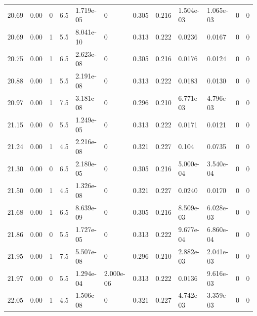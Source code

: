 \documentclass[preview]{standalone}
\begin{document}
{{{{{{\begin{tabular}{L{1.2cm}C{1.2cm} C{0.3cm}C{0.5cm} C{1.4cm}C{1.4cm} C{1.4cm}C{1.4cm} C{1.6cm}C{1.6cm} C{1.6cm}C{1.6cm}}
  20.69  &  0.00  & 0     & 6.5 &  1.719e-05  & 0  &  0.305&   0.216& 1.504e-03 & 1.065e-03   &  0 & 0  \\ 
  20.69  &  0.00  & 1     & 5.5 &  8.041e-10  & 0  &  0.313&   0.222& 0.0236 & 0.0167   &  0 & 0  \\ 
  20.75  &  0.00  & 1     & 6.5 &  2.623e-08  & 0  &  0.305&   0.216& 0.0176 & 0.0124   &  0 & 0  \\ 
  20.88  &  0.00  & 1     & 5.5 &  2.191e-08  & 0  &  0.313&   0.222& 0.0183 & 0.0130   &  0 & 0  \\ 
  20.97  &  0.00  & 1     & 7.5 &  3.181e-08  & 0  &  0.296&   0.210& 6.771e-03 & 4.796e-03   &  0 & 0  \\ 
  21.15  &  0.00  & 0     & 5.5 &  1.249e-05  & 0  &  0.313&   0.222& 0.0171 & 0.0121   &  0 & 0  \\ 
  21.24  &  0.00  & 1     & 4.5 &  2.216e-08  & 0  &  0.321&   0.227& 0.104 & 0.0735   &  0 & 0  \\ 
  21.30  &  0.00  & 0     & 6.5 &  2.180e-05  & 0  &  0.305&   0.216& 5.000e-04 & 3.540e-04   &  0 & 0  \\ 
  21.50  &  0.00  & 1     & 4.5 &  1.326e-08  & 0  &  0.321&   0.227& 0.0240 & 0.0170   &  0 & 0  \\ 
  21.68  &  0.00  & 1     & 6.5 &  8.639e-09  & 0  &  0.305&   0.216& 8.509e-03 & 6.028e-03   &  0 & 0  \\ 
  21.86  &  0.00  & 0     & 5.5 &  1.727e-05  & 0  &  0.313&   0.222& 9.677e-04 & 6.860e-04   &  0 & 0  \\ 
  21.95  &  0.00  & 1     & 7.5 &  5.507e-08  & 0  &  0.296&   0.210& 2.882e-03 & 2.041e-03   &  0 & 0  \\ 
  21.97  &  0.00  & 0     & 5.5 &  1.294e-04  & 2.000e-06  &  0.313&   0.222& 0.0136 & 9.616e-03   &  0 & 0  \\ 
  22.05  &  0.00  & 1     & 4.5 &  1.506e-08  & 0  &  0.321&   0.227& 4.742e-03 & 3.359e-03   &  0 & 0  \\ 
\hline 
\end{tabular} 

}}}}}}
\end{document}
